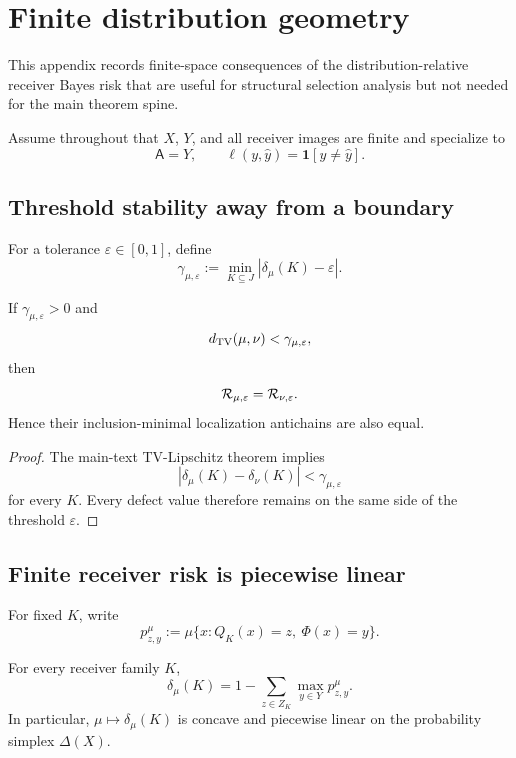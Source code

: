 \section{Finite distribution geometry}
\label{app:finite-distribution-geometry}

This appendix records finite-space consequences of the distribution-relative receiver Bayes risk that are useful for structural selection analysis but not needed for the main theorem spine.

Assume throughout that $X$, $Y$, and all receiver images are finite and specialize to
\[
\mathsf A=Y,
\qquad
\ell(y,\hat y)=\mathbf 1[y\neq\hat y].
\]

\subsection{Threshold stability away from a boundary}

For a tolerance $\varepsilon\in[0,1]$, define
\[
\gamma_{\mu,\varepsilon}
:=
\min_{K\subseteq J}
|\delta_\mu(K)-\varepsilon|.
\]

\begin{corollary}
\label{cor:app-localization-family-stability}
If $\gamma_{\mu,\varepsilon}>0$ and
\[
d_{\operatorname{TV}}(\mu,\nu)<\gamma_{\mu,\varepsilon},
\]
then
\[
\mathcal{R}_{\mu,\varepsilon}
=
\mathcal{R}_{\nu,\varepsilon}.
\]
Hence their inclusion-minimal localization antichains are also equal.
\end{corollary}

\begin{proof}
The main-text TV-Lipschitz theorem implies
\[
|\delta_\mu(K)-\delta_\nu(K)|
<\gamma_{\mu,\varepsilon}
\]
for every $K$. Every defect value therefore remains on the same side of the threshold $\varepsilon$.
\end{proof}

\subsection{Finite receiver risk is piecewise linear}

For fixed $K$, write
\[
p_{z,y}^\mu
:=
\mu\{x:Q_K(x)=z,\ \Phi(x)=y\}.
\]

\begin{proposition}
\label{thm:app-bayes-defect-formula}
For every receiver family $K$,
\[
\delta_\mu(K)
=
1-\sum_{z\in Z_K}\max_{y\in Y}p_{z,y}^\mu.
\]
In particular, $\mu\mapsto\delta_\mu(K)$ is concave and piecewise linear on the probability simplex $\Delta(X)$.
\end{proposition}

